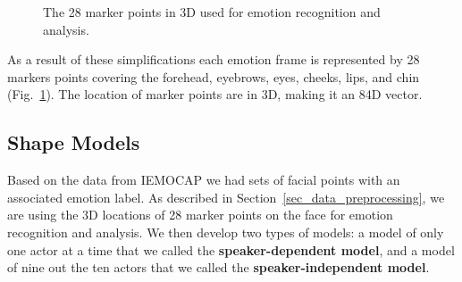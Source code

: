 \documentclass[10pt,journal,cspaper,compsoc]{IEEEtran}
\begin{document}
\begin{figure}[ht!]
\begin{center}
\caption{The 28 marker points in 3D used for emotion recognition and analysis.}
\label{fig_markers_3D}
\end{center}
\end{figure}


As a result of these simplifications each emotion frame is represented by 28 markers points covering the forehead, eyebrows, eyes, cheeks, lips, and chin (Fig.~\ref{fig_markers_3D}). The location of marker points are in 3D, making it an 84D vector.

\subsection{Shape Models}
\label{sec_shape_models}

Based on the data from IEMOCAP we had sets of facial points with an associated emotion label. As described in Section~\ref{sec_data_preprocessing}, we are using the 3D locations of 28 marker points on the face for emotion recognition and analysis. We then develop two types of models: a model of only one actor at a time that we called the \textbf{speaker-dependent model}, and a model of nine out the ten actors that we called the \textbf{speaker-independent model}. 
\end{document}
